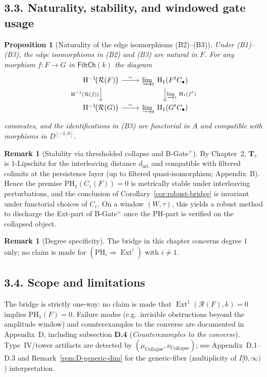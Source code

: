 \documentclass[11pt]{article}
\DeclareMathOperator{\Ext}{Ext}
\newcommand{\rH}{\mathrm{H}}
\numberwithin{equation}{section}
\newtheorem{proposition}[theorem]{Proposition}
\theoremstyle{definition}
\newtheorem{remark}[theorem]{Remark}
\providecommand{\n}{\unskip\space}
\begin{document}
\subsection*{3.3. Naturality, stability, and windowed gate usage}
\begin{proposition}[Naturality of the edge isomorphisms (B2)–(B3)]
Under \textup{(B1)–(B3)}, the edge isomorphisms in \textup{(B2)} and \textup{(B3)} are natural in \(F\). For any morphism \(f:F\to G\) in \(\mathsf{FiltCh}(k)\) the diagram
\[
\begin{tikzcd}\n\rH^{-1}\!\big(\mathcal{R}(F)\big) \arrow[r,"\sim"] \arrow[d,"\rH^{-1}(\mathcal{R}(f))"'] &\n\varinjlim_t \,\rH_1(F^tC_\bullet) \arrow[d,"\varinjlim_t\, \rH_1(f^t)"] \\\n\rH^{-1}\!\big(\mathcal{R}(G)\big) \arrow[r,"\sim"] &\n\varinjlim_t \,\rH_1(G^tC_\bullet)\n\end{tikzcd}
\]
commutes, and the identifications in \textup{(B3)} are functorial in \(A\) and compatible with morphisms in \(D^{[-1,0]}\).
\end{proposition}

\begin{remark}[Stability via thresholded collapse and B-Gate$^{+}$]
By Chapter~2, \(\mathbf{T}_\tau\) is \(1\)-Lipschitz for the interleaving distance \(d_{\mathrm{int}}\) and compatible with filtered colimits at the persistence layer (up to filtered quasi-isomorphism; Appendix~B). Hence the premise \(\mathrm{PH}_1(C_\varepsilon(F))=0\) is metrically stable under interleaving perturbations, and the conclusion of Corollary~\ref{cor:robust-bridge} is invariant under functorial choices of \(C_\varepsilon\). On a window \((W,\tau)\), this yields a robust method to discharge the Ext-part of B-Gate$^{+}$ once the PH-part is verified on the collapsed object.
\end{remark}

\begin{remark}[Degree specificity]
The bridge in this chapter concerns degree \(1\) only; no claim is made for \((\mathrm{PH}_i \Rightarrow \Ext^i)\) with \(i\neq 1\).
\end{remark}

\subsection*{3.4. Scope and limitations}
The bridge is strictly one-way: no claim is made that \(\Ext^1(\mathcal{R}(F),k)=0\) implies \(\mathrm{PH}_1(F)=0\).
Failure modes (e.g.\ invisible obstructions beyond the amplitude window) and counterexamples to the converse are documented in Appendix~D, including subsection \textbf{D.4} (\emph{Counterexamples to the converse}). Type~IV/tower artifacts are detected by \((\mu_{\mathrm{Collapse}},\nu_{\mathrm{Collapse}})\); see Appendix~D.1–D.3 and Remark~\ref{rem:D-generic-dim} for the generic-fiber (multiplicity of \(I[0,\infty)\)) interpretation.
\end{document}
